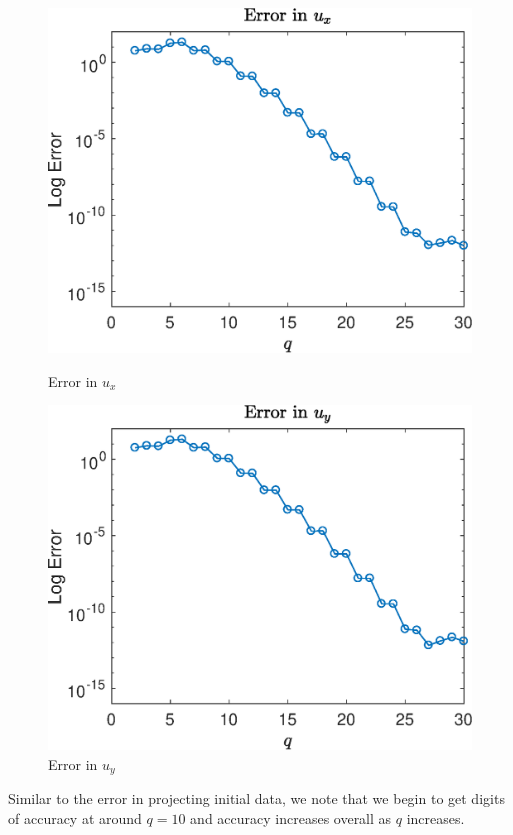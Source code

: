 \documentclass{article}
\begin{document}
\begin{figure}[H]
  \centering
  \begin{minipage}{.6\textwidth}
    \centering
    \includegraphics[width=\linewidth]{media/derivative_x_error.eps}
    \caption{Error in $u_x$}
    \label{fig:beta0}
  \end{minipage}%
  \begin{minipage}{.6\textwidth}
    \centering
    \includegraphics[width=\linewidth]{media/derivative_y_error.eps}
    \caption{Error in $u_y$}
    \label{fig:beta1}
  \end{minipage}%
\end{figure}
\noindent Similar to the error in projecting initial data, we note that we begin to get digits of accuracy at around $q = 10$ and accuracy increases overall as $q$ increases.
\end{document}
